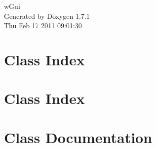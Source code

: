 \documentclass[a4paper]{book}
\begin{document}
\hypersetup{pageanchor=false}
\begin{titlepage}
\vspace*{7cm}
\begin{center}
{\Large wGui }\\
\vspace*{1cm}
{\large Generated by Doxygen 1.7.1}\\
\vspace*{0.5cm}
{\small Thu Feb 17 2011 09:01:30}\\
\end{center}
\end{titlepage}
\clearemptydoublepage
{}
\tableofcontents
\clearemptydoublepage
{}
\hypersetup{pageanchor=true}
\chapter{Class Index}

\chapter{Class Index}

\chapter{Class Documentation}

























\printindex
\end{document}
